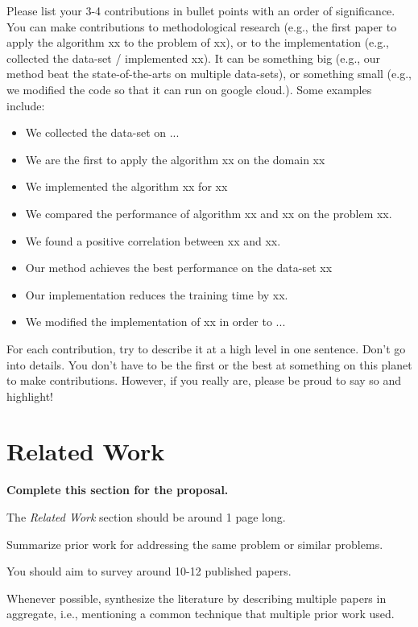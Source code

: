 \documentclass[letterpaper]{article} %
\begin{document}
Please list your 3-4 contributions in bullet points with an order of significance. You can make contributions to methodological research (e.g., the first paper to apply the algorithm xx to the problem of xx), or to the implementation (e.g., collected the data-set / implemented xx). It can be something big (e.g., our method beat the state-of-the-arts on multiple data-sets), or something small (e.g., we modified the code so that it can run on google cloud.). Some examples include:
\begin{itemize}
    \item We collected the data-set on ...
    \item We are the first to apply the algorithm xx on the domain xx
    \item We implemented the algorithm xx for xx 
    \item We compared the performance of algorithm xx and xx on the problem xx.
    \item We found a positive correlation between xx and xx.
    \item Our method achieves the best performance on the data-set xx
    \item Our implementation reduces the training time by xx.
    \item We modified the implementation of xx in order to ...
\end{itemize}

For each contribution, try to describe it at a high level in one sentence. Don't go into details. You don't have to be the first or the best at something on this planet to make contributions. However, if you really are, please be proud to say so and highlight!



\section{Related Work} 

{\bf Complete this section for the proposal.}

The {\em Related Work} section should be around 1 page long.

Summarize prior work for addressing the same problem or similar problems. 

You should aim to survey around 10-12 published papers. 

Whenever possible, synthesize the literature by describing multiple papers in aggregate, i.e., mentioning a common technique that multiple prior work used. 
\end{document}
